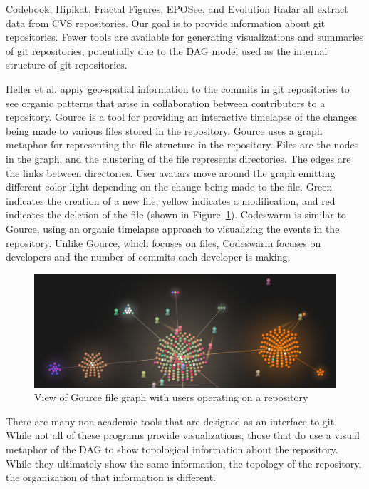 Codebook, Hipikat, Fractal Figures, EPOSee, and Evolution Radar all
extract data from CVS repositories. Our goal is to provide information
about git repositories. Fewer tools are available for generating
visualizations and summaries of git repositories, potentially due to the
DAG model used as the internal structure of git repositories.

Heller et al.\cite{Heller2011} apply geo-spatial information to the
commits in git repositories to see organic patterns that arise in
collaboration between contributors to a repository.
Gource\cite{Caudwell2010} is a tool for providing an interactive
timelapse of the changes being made to various files stored in the
repository. Gource uses a graph metaphor for representing the file
structure in the repository. Files are the nodes in the graph, and the
clustering of the file represents directories. The edges are the links
between directories. User avatars move around the graph emitting
different color light depending on the change being made to the file.
Green indicates the creation of a new file, yellow indicates a
modification, and red indicates the deletion of the file (shown in
Figure~\ref{fig:gource_view}). Codeswarm\cite{ogawa09} is similar to
Gource, using an organic timelapse approach to visualizing the events in
the repository. Unlike Gource, which focuses on files, Codeswarm focuses
on developers and the number of commits each developer is making.

\begin{figure}[htpb]
  \centering
  \includegraphics[width=0.8\linewidth]{./Figures/introduction/gource-linux.jpg}
  \caption{View of Gource file graph with users operating on a
    repository}
  \label{fig:gource_view}
\end{figure}

There are many non-academic tools that are designed as an interface to
git. While not all of these programs provide visualizations, those that
do use a visual metaphor of the DAG to show topological information
about the repository. While they ultimately show the same information,
the topology of the repository, the organization of that information is
different.

